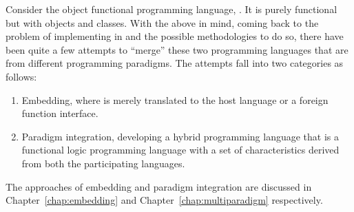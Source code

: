\documentclass[thesis-solanki.tex]{subfiles}
\begin{document}
Consider the object functional programming language, 
\cite{website:scala}.
It is purely functional but with objects and classes.
With the above in mind, coming back to the problem of implementing  in  and the
possible methodologies to do so, there have been quite a few attempts to ``merge'' these two programming languages
that are from different programming paradigms.
The attempts fall into two categories as follows:

\begin{enumerate}
\item
  Embedding, where  is merely translated to the host language  or a foreign
  function interface.

\item
  Paradigm integration, developing a hybrid programming language that is a functional logic programming language
  with a set of characteristics derived from both the participating languages.
\end{enumerate}
The approaches of embedding and paradigm integration are discussed in Chapter~\ref{chap:embedding} and
Chapter~\ref{chap:multiparadigm} respectively.


\ifMain\ifDraft
\begin{scope}
  \nolinenumbers
  \enotesize
  \par
  \begin{singlespace}
  \setlength{\parskip}{12pt plus 2pt minus 1pt}
  \theendnotes
  \par
  \end{singlespace}
\end{scope}
\fi\fi
\end{document}
